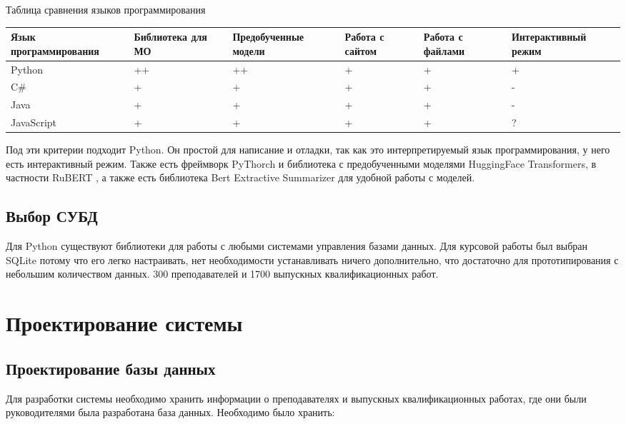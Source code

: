 \documentclass[PI,KR]{HSEUniversity}
\begin{document}
\begin{TABLE}[!h]{Таблица сравнения языков программирования \label{tbl:tableProg}}
	\begin{tabular}[c]{|p{3cm}|p{2cm}|p{3cm}|p{2cm}|p{2cm}|p{3cm}|}
		\hline
		Язык программирования & Библиотека для МО & Предобученные модели & Работа с сайтом & Работа с файлами & Интерактивный режим\\ \hline
		Python 		& ++ & ++ & + & + & + \\ \hline
		C\# 		& +  & +  & + & + & - \\ \hline
		Java 		& +  & +  & + & + & - \\ \hline
		JavaScript 	& +  & +  & + & + & ? \\ \hline
	\end{tabular}
\end{TABLE}

Под эти критерии подходит Python. Он простой для написание и отладки, так как это интерпретируемый язык программирования, у него есть интерактивный режим. Также есть фреймворк PyThorch и библиотека с предобученными моделями HuggingFace Transformers, в частности RuBERT \cite{kuratov2019adaptation}, а также есть библиотека Bert Extractive Summarizer \cite{miller2019leveraging} для удобной работы с моделей.

\section{Выбор СУБД}
Для Python существуют библиотеки для работы с любыми системами управления базами данных. Для курсовой работы был выбран SQLite потому что его легко настраивать, нет необходимости устанавливать ничего дополнительно, что достаточно для прототипирования с небольшим количеством данных. 300 преподавателей и 1700 выпускных квалификационных работ.
\chapter{Проектирование системы}
\section{Проектирование базы данных}
Для разработки системы необходимо хранить информации о преподавателях и выпускных квалификационных работах, где они были руководителями была разработана база данных. Необходимо было хранить:
\end{document}
